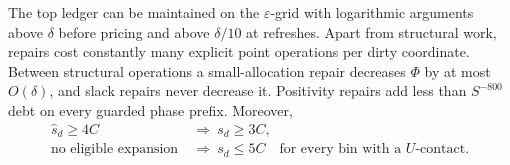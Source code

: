 \begin{lemma}
\label{match:top-maintenance}
The top ledger can be maintained on the \(\varepsilon\)-grid with
logarithmic arguments above \(\delta\) before pricing and above
\(\delta/10\) at refreshes.  Apart from structural work, repairs
cost constantly many explicit point operations per dirty coordinate.
Between structural operations a small-allocation repair decreases
\(\Phi\) by at most \(O(\delta)\), and slack repairs never decrease it.
Positivity repairs add less than \(S^{-800}\) debt on every guarded
phase prefix.  Moreover,
\begin{equation}
 \begin{split}
 \widehat s_d\ge4C&\ \Longrightarrow\ s_d\ge3C,\\
 \text{no eligible expansion}&\ \Longrightarrow\
 s_d\le5C\quad\text{for every bin with a \(U\)-contact}.
 \end{split}
 \label{match:contact-slacks}
\end{equation}
\end{lemma}
